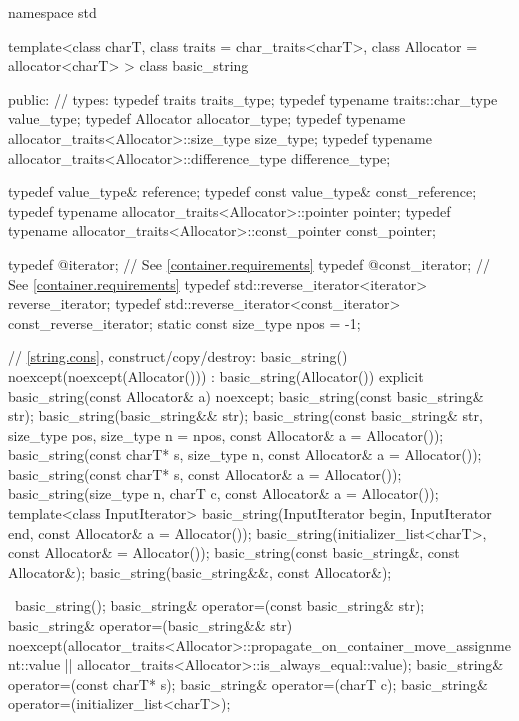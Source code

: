 %
\begin{codeblock}
namespace std {
  template<class charT, class traits = char_traits<charT>,
    class Allocator = allocator<charT> >
  class basic_string {
  public:
    // types:
    typedef          traits                                         traits_type;
    typedef typename traits::char_type                              value_type;
    typedef          Allocator                                      allocator_type;
    typedef typename allocator_traits<Allocator>::size_type         size_type;
    typedef typename allocator_traits<Allocator>::difference_type   difference_type;

    typedef value_type& reference;
    typedef const value_type&   const_reference;
    typedef typename allocator_traits<Allocator>::pointer           pointer;
    typedef typename allocator_traits<Allocator>::const_pointer     const_pointer;

    typedef @\impdef@              iterator;       // See \ref{container.requirements}
    typedef @\impdef@              const_iterator; // See \ref{container.requirements}
    typedef std::reverse_iterator<iterator> reverse_iterator;
    typedef std::reverse_iterator<const_iterator> const_reverse_iterator;
    static const size_type npos = -1;

    // \ref{string.cons}, construct/copy/destroy:
    basic_string() noexcept(noexcept(Allocator())) : basic_string(Allocator()) { }
    explicit basic_string(const Allocator& a) noexcept;
    basic_string(const basic_string& str);
    basic_string(basic_string&& str);
    basic_string(const basic_string& str, size_type pos, size_type n = npos,
                 const Allocator& a = Allocator());
    basic_string(const charT* s,
                 size_type n, const Allocator& a = Allocator());
    basic_string(const charT* s, const Allocator& a = Allocator());
    basic_string(size_type n, charT c, const Allocator& a = Allocator());
    template<class InputIterator>
      basic_string(InputIterator begin, InputIterator end,
                   const Allocator& a = Allocator());
    basic_string(initializer_list<charT>, const Allocator& = Allocator());
    basic_string(const basic_string&, const Allocator&);
    basic_string(basic_string&&, const Allocator&);

   ~basic_string();
    basic_string& operator=(const basic_string& str);
    basic_string& operator=(basic_string&& str)
      noexcept(allocator_traits<Allocator>::propagate_on_container_move_assignment::value ||
               allocator_traits<Allocator>::is_always_equal::value);
    basic_string& operator=(const charT* s);
    basic_string& operator=(charT c);
    basic_string& operator=(initializer_list<charT>);

}}
\end{codeblock}
